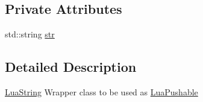 \subsection*{Private Attributes}
\begin{DoxyCompactItemize}
\item 
std\+::string \hyperlink{classZeta_1_1LuaString_a80a19e5adfd90bc98ae80740edb99e5b}{str}
\end{DoxyCompactItemize}


\subsection{Detailed Description}
\hyperlink{classZeta_1_1LuaString}{Lua\+String} Wrapper class to be used as \hyperlink{classZeta_1_1LuaPushable}{Lua\+Pushable} 

